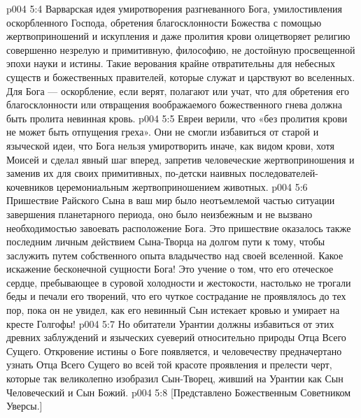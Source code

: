 \vs p004 5:4 \pc Варварская идея умиротворения разгневанного Бога, умилостивления оскорбленного Господа, обретения благосклонности Божества с помощью жертвоприношений и искупления и даже пролития крови олицетворяет религию совершенно незрелую и примитивную, философию, не достойную просвещенной эпохи науки и истины. Такие верования крайне отвратительны для небесных существ и божественных правителей, которые служат и царствуют во вселенных. Для Бога --- оскорбление, если верят, полагают или учат, что для обретения его благосклонности или отвращения воображаемого божественного гнева должна быть пролита невинная кровь.
\vs p004 5:5 Евреи верили, что «без пролития крови не может быть отпущения греха». Они не смогли избавиться от старой и языческой идеи, что Бога нельзя умиротворить иначе, как видом крови, хотя Моисей и сделал явный шаг вперед, запретив человеческие жертвоприношения и заменив их для своих примитивных, по\hyp{}детски наивных последователей\hyp{}кочевников церемониальным жертвоприношением животных.
\vs p004 5:6 Пришествие Райского Сына в ваш мир было неотъемлемой частью ситуации завершения планетарного периода, оно было неизбежным и не вызвано необходимостью завоевать расположение Бога. Это пришествие оказалось также последним личным действием Сына\hyp{}Творца на долгом пути к тому, чтобы заслужить путем собственного опыта владычество над своей вселенной. Какое искажение бесконечной сущности Бога! Это учение о том, что его отеческое сердце, пребывающее в суровой холодности и жестокости, настолько не трогали беды и печали его творений, что его чуткое сострадание не проявлялось до тех пор, пока он не увидел, как его невинный Сын истекает кровью и умирает на кресте Голгофы!
\vs p004 5:7 Но обитатели Урантии должны избавиться от этих древних заблуждений и языческих суеверий относительно природы Отца Всего Сущего. Откровение истины о Боге появляется, и человечеству предначертано узнать Отца Всего Сущего во всей той красоте проявления и прелести черт, которые так великолепно изобразил Сын\hyp{}Творец, живший на Урантии как Сын Человеческий и Сын Божий.
\vsetoff
\vs p004 5:8 [Представлено Божественным Советником Уверсы.]
